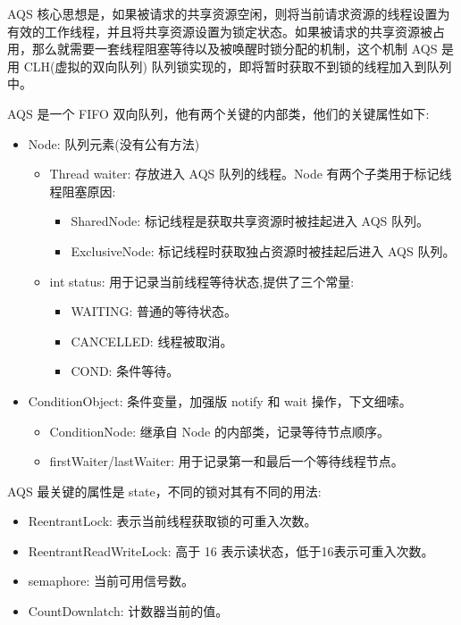 AQS 核心思想是，如果被请求的共享资源空闲，则将当前请求资源的线程设置为有效的工作线程，并且将共享资源设置为锁定状态。如果被请求的共享资源被占用，那么就需要一套线程阻塞等待以及被唤醒时锁分配的机制，这个机制 AQS 是用 CLH(虚拟的双向队列) 队列锁实现的，即将暂时获取不到锁的线程加入到队列中。

AQS 是一个 FIFO 双向队列，他有两个关键的内部类，他们的关键属性如下:
\begin{itemize}
    \item Node: 队列元素(没有公有方法)
    \begin{itemize}
        \item Thread waiter: 存放进入 AQS 队列的线程。Node 有两个子类用于标记线程阻塞原因:
        \begin{itemize}
            \item SharedNode: 标记线程是获取共享资源时被挂起进入 AQS 队列。
            \item ExclusiveNode: 标记线程时获取独占资源时被挂起后进入 AQS 队列。
        \end{itemize}
        \item int status: 用于记录当前线程等待状态,提供了三个常量:
        \begin{itemize}
            \item WAITING: 普通的等待状态。
            \item CANCELLED: 线程被取消。
            \item COND: 条件等待。
        \end{itemize}
    \end{itemize}
    \item ConditionObject: 条件变量，加强版 notify 和 wait 操作，下文细嗦。
    \begin{itemize}
        \item ConditionNode: 继承自 Node 的内部类，记录等待节点顺序。
        \item firstWaiter/lastWaiter: 用于记录第一和最后一个等待线程节点。
    \end{itemize}
\end{itemize}

AQS 最关键的属性是 state，不同的锁对其有不同的用法:
\begin{itemize}
    \item ReentrantLock: 表示当前线程获取锁的可重入次数。
    \item ReentrantReadWriteLock: 高于 16 表示读状态，低于16表示可重入次数。
    \item semaphore: 当前可用信号数。
    \item CountDownlatch: 计数器当前的值。
\end{itemize}

